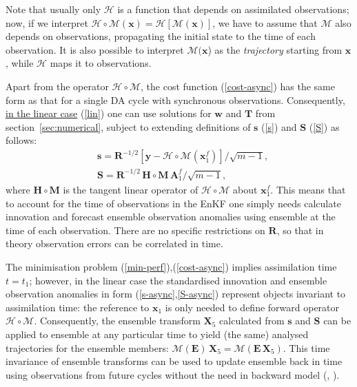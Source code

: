 \documentclass[11pt]{report}
\newcommand{\mb} {\mathbf}
\begin{document}
Note that usually only $\mathcal H$ is a function that depends on assimilated observations; now, if we interpret $\mathcal H \circ \mathcal M (\mb x) = \mathcal H[\mathcal M(\mb x)]$, we have to assume that $\mathcal M$ also depends on observations, propagating the initial state to the time of each observation.
It is also possible to interpret $\mathcal M(\mb x$) as the \emph{trajectory} starting from $\mb x$, while $\mathcal H$ maps it to observations.

Apart from the operator $\mathcal H \circ \mathcal M$, the cost function (\ref{cost-async}) has the same form as that for a single DA cycle with synchronous observations.
Consequently, \underline{in the linear case} (\ref{lin}) one can use solutions for $\mb w$ and $\mb T$ from section~\ref{sec:numerical}, subject to extending definitions of $\mb s$ (\ref{s}) and $\mb S$ (\ref{S}) as follows:
\begin{align}
  \label{s-async}
  &\mb s = \mb R^{-1/2} \left[ \mb y - \mathcal H \circ \mathcal M (\mb x_1^f) \right] / \sqrt{m - 1},\\
  \label{S-async}
  &\mb S = \mb R^{-1/2} \, \mb H \circ \mb M \, \mb A_1^f / \sqrt{m - 1},
\end{align}
where $\mb H \circ \mb M$ is the tangent linear operator of $\mathcal H \circ \mathcal M$ about $\mb x_1^f$.
This means that to account for the time of observations in the EnKF one simply needs calculate innovation and forecast ensemble observation anomalies using ensemble at the time of each observation.
There are no specific restrictions on $\mb R$, so that in theory observation errors can be correlated in time.

The minimisation problem (\ref{min-perf}),(\ref{cost-async}) implies assimilation time $t = t_1$; however, in the linear case the standardised innovation and ensemble observation anomalies in form (\ref{s-async},\ref{S-async}) represent objects invariant to assimilation time: the reference to $\mb x_1$ is only needed to define forward operator $\mathcal H \circ \mathcal M$.
Consequently, the ensemble transform $\mb X_5$ calculated from $\mb s$ and $\mb S$ can be applied to ensemble at any particular time to yield (the same) analysed trajectories for the ensemble members: $\mathcal M (\mb E) \, \mb X_5 = \mathcal M (\mb E \, \mb X_5)$.
This time invariance of ensemble transforms can be used to update ensemble back in time using observations from future cycles without the need in backward model (\citealt[][sec.~6]{eve00a}, \citealt[][app.~D]{eve03a}).
\end{document}
